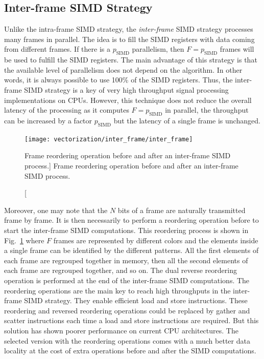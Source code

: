 \subsection{Inter-frame SIMD Strategy}
\label{sec:opt_vec_strat_inter}

Unlike the intra-frame SIMD strategy, the \emph{inter-frame} SIMD strategy
processes many frames in parallel. The idea is to fill the SIMD registers with
data coming from different frames. If there is a $p_\text{SIMD}$ parallelism,
then $F = p_\text{SIMD}$ frames will be used to fulfill the SIMD registers. The
main advantage of this strategy is that the available level of parallelism does
not depend on the algorithm. In other words, it is always possible to use 100\%
of the SIMD registers. Thus, the inter-frame SIMD strategy is a key of very high
throughput signal processing implementations on CPUs. However, this technique
does not reduce the overall latency of the processing as it computes $F =
p_\text{SIMD}$ in parallel, the throughput can be increased by a factor
$p_\text{SIMD}$ but the latency of a single frame is unchanged.

\begin{figure}[htp]
  \centering
  \texttt{[image: vectorization/inter\_frame/inter\_frame]}
  \caption
    [Frame reordering operation before and after an inter-frame SIMD process.]
    {Frame reordering operation before and after an inter-frame SIMD process.}
  \label{fig:vec_reordering_process_inter_simd}
\end{figure}

Moreover, one may note that the $N$ bits of a frame are naturally transmitted
frame by frame. It is then necessarily to perform a reordering operation before
to start the inter-frame SIMD computations. This reordering process is shown in
Fig.~\ref{fig:vec_reordering_process_inter_simd} where $F$ frames are
represented by different colors and the elements inside a single frame can be
identified by the different patterns. All the first elements of each frame are
regrouped together in memory, then all the second elements of each frame are
regrouped together, and so on. The dual reverse reordering operation is
performed at the end of the inter-frame SIMD computations. The reordering
operations are the main key to reach high throughputs in the inter-frame SIMD
strategy. They enable efficient load and store instructions. These reordering
and reversed reordering operations could be replaced by gather and scatter
instructions each time a load and store instructions are required. But this
solution has shown poorer performance on current CPU architectures. The selected
version with the reordering operations comes with a much better data locality at
the cost of extra operations before and after the SIMD computations.

